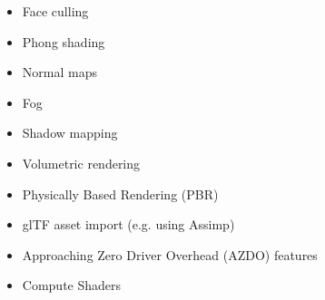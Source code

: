 \documentclass[calcdimensions,landscape,letterpaper]{powersem}
\newcommand{\thecurrentheading}{}
\newcommand{\heading}[1]{\renewcommand{\thecurrentheading}{#1}}
\begin{document}
\begin{slide}
  \heading{Further Topics}
  \begin{center}
    \begin{minipage}[c]{.6\textwidth}
      \begin{itemize}
        \item Face culling
        \item Phong shading
        \item Normal maps
        \item Fog
        \item Shadow mapping
        \item Volumetric rendering
        \item Physically Based Rendering (PBR)
        \item glTF asset import (e.g. using Assimp)
        \item Approaching Zero Driver Overhead (AZDO) features
        \item Compute Shaders
      \end{itemize}
    \end{minipage}
  \end{center}
\end{slide}
\end{document}
